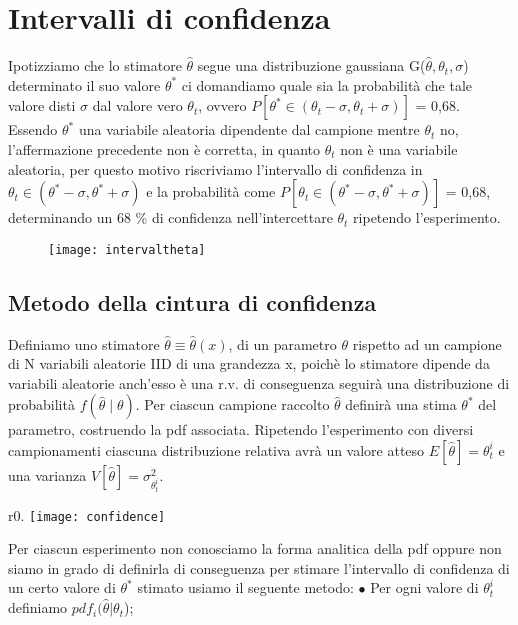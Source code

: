 \section{Intervalli di confidenza}

Ipotizziamo che lo stimatore $\hat{\theta}$ segue una distribuzione gaussiana G($\hat{\theta},\theta_t,\sigma$) determinato il suo valore $\theta^*$ ci domandiamo quale sia la probabilit\`{a} che tale valore disti $\sigma$ dal valore vero $\theta_t$, ovvero $P[\theta^* \in (\theta_t - \sigma, \theta_t + \sigma)]$ = 0,68. Essendo $\theta^*$ una variabile aleatoria dipendente dal campione mentre $\theta_t$ no, l'affermazione precedente non \`{e} corretta, in quanto $\theta_t$ non \`{e} una variabile aleatoria, per questo motivo riscriviamo l'intervallo di confidenza in $ \theta_t \in (\theta^* - \sigma,\theta^* + \sigma)$ e la probabilit\`{a} come $P[\theta_t \in (\theta^* - \sigma, \theta^* + \sigma)]$ = 0,68, determinando un 68 \% di confidenza nell'intercettare $\theta_t$ ripetendo l'esperimento.
\begin{figure}[ht]
\vspace{0.1in}
\texttt{[image: intervaltheta]}	
\centering
\end{figure}

\subsection{Metodo della cintura di confidenza}

Definiamo uno stimatore $\hat{\theta} \equiv \hat{\theta}(x)$, di un parametro $\theta$ rispetto ad un campione di N variabili aleatorie IID di una grandezza x, poich\`{e} lo stimatore dipende da variabili aleatorie anch'esso \`{e} una r.v. di conseguenza seguir\`{a} una distribuzione di probabilit\`{a} $f(\hat{\theta} \;\vert \; \theta)$. Per ciascun campione raccolto $\hat{\theta}$ definir\`{a} una stima $\theta^*$ del parametro, costruendo la pdf associata. Ripetendo l'esperimento con diversi campionamenti ciascuna distribuzione relativa  avr\`{a} un valore atteso $E[\hat{\theta}] = \theta_{t}^{i}$ e una varianza $V[\hat{\theta}] = \sigma_{\theta_{t}^i}^2$.
\begin{wrapfigure}{r}{0.\textwidth}
\centering
\texttt{[image: confidence]}	
\end{wrapfigure}
Per ciascun esperimento non conosciamo la forma analitica della pdf oppure non siamo in grado di definirla di conseguenza per stimare l'intervallo di confidenza di un certo valore di $\theta^*$ stimato usiamo il seguente metodo:
\newline
$\bullet$ Per ogni valore di $\theta_{t}^i$ definiamo $pdf_i(\hat{\theta} \vert \theta_t$);\newline

